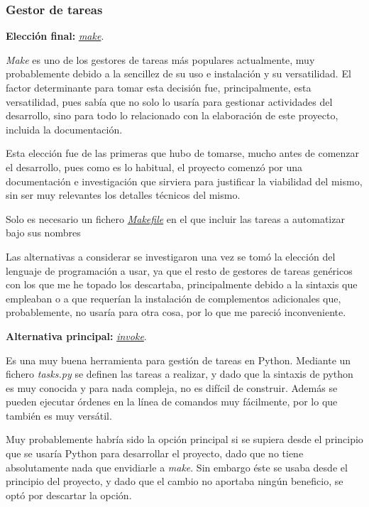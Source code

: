 \subsubsection{Gestor de tareas}

\textbf{Elección final:} \href{https://www.gnu.org/software/make/}{\textit{make}}.

\textit{Make} es uno de los gestores de tareas más populares actualmente, muy probablemente debido a la sencillez de su uso e instalación y su versatilidad. El factor determinante para tomar esta decisión fue, principalmente, esta versatilidad, pues sabía que no solo lo usaría para gestionar actividades del desarrollo, sino para todo lo relacionado con la elaboración de este proyecto, incluida la documentación.

Esta elección fue de las primeras que hubo de tomarse, mucho antes de comenzar el desarrollo, pues como es lo habitual, el proyecto comenzó por una documentación e investigación que sirviera para justificar la viabilidad del mismo, sin ser muy relevantes los detalles técnicos del mismo.

Solo es necesario un fichero \href{https://github.com/Anglepi/My-Many-Reads/blob/main/Makefile}{\textit{Makefile}} en el que incluir las tareas a automatizar bajo sus nombres

Las alternativas a considerar se investigaron una vez se tomó la elección del lenguaje de programación a usar, ya que el resto de gestores de tareas genéricos con los que me he topado los descartaba, principalmente debido a la sintaxis que empleaban o a que requerían la instalación de complementos adicionales que, probablemente, no usaría para otra cosa, por lo que me pareció inconveniente.

\textbf{Alternativa principal:} \href{https://www.pyinvoke.org/}{\textit{invoke}}.

Es una muy buena herramienta para gestión de tareas en Python. Mediante un fichero \textit{tasks.py} se definen las tareas a realizar, y dado que la sintaxis de python es muy conocida y para nada compleja, no es difícil de construir. Además se pueden ejecutar órdenes en la línea de comandos muy fácilmente, por lo que también es muy versátil.

Muy probablemente habría sido la opción principal si se supiera desde el principio que se usaría Python para desarrollar el proyecto, dado que no tiene absolutamente nada que envidiarle a \textit{make}. Sin embargo éste se usaba desde el principio del proyecto, y dado que el cambio no aportaba ningún beneficio, se optó por descartar la opción.

